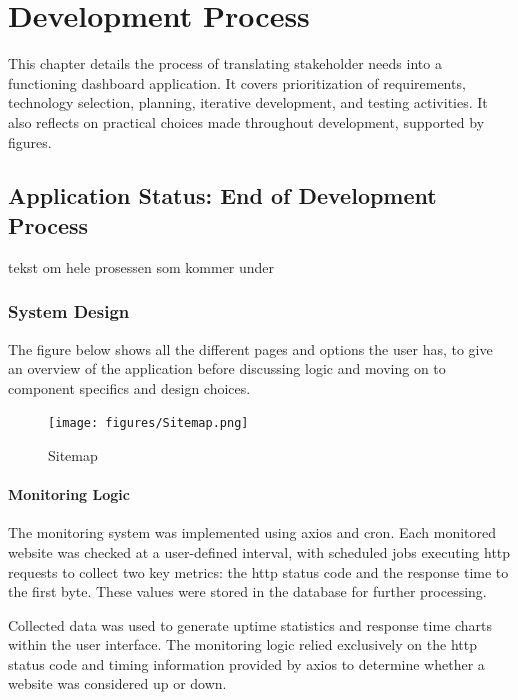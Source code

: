 \chapter{Development Process}
\label{ch:development_process}

This chapter details the process of translating stakeholder needs into a functioning dashboard application. It covers prioritization of requirements, technology selection, planning, iterative development, and testing activities. It also reflects on practical choices made throughout development, supported by figures.



\section{Application Status: End of Development Process}
\label{sec:status_at_completion}
tekst om hele prosessen som kommer under

\subsection{System Design}
\label{subsec:system_design}
The figure below shows all the different pages and options the user has, to give an overview of the application before discussing logic and moving on to component specifics and design choices.

\begin{figure}[htbp]
        \centering
        \texttt{[image: figures/Sitemap.png]}
        \caption{Sitemap}
        \label{fig:sitemap}
\end{figure} 

\subsubsection{Monitoring Logic}
\label{subsubsec:monitoring_logic}
The monitoring system was implemented using \gls{axios} and \gls{cron}. Each monitored website was checked at a user-defined interval, with scheduled jobs executing \acrshort{http} requests to collect two key metrics: the \acrshort{http} status code and the response time to the first byte. These values were stored in the database for further processing.

Collected data was used to generate uptime statistics and response time charts within the user interface. The monitoring logic relied exclusively on the \acrshort{http} status code and timing information provided by \gls{axios} to determine whether a website was considered up or down.

